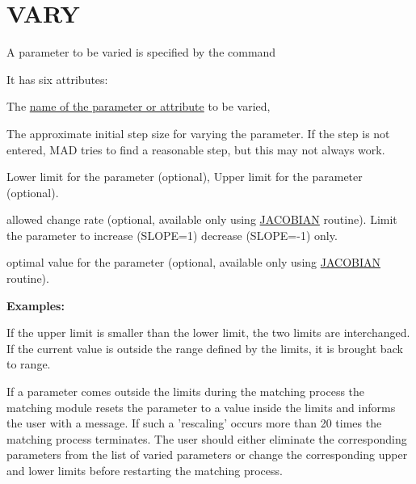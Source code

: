 \section{VARY}
\label{sec:vary}
A parameter to be varied is specified by the command 


It has six attributes: 
\begin{madlist}
   The \href{../Introduction/variable.html}{name of the
    parameter or attribute} to be varied,  

   The approximate initial step size for varying the
  parameter. If the step is not entered, MAD tries to find a
  reasonable step, but this may not always work.  

   Lower limit for the parameter (optional), 
   Upper limit for the parameter (optional). 

   allowed change rate (optional, available only using
  \href{match_xeq.html#jacobian}{JACOBIAN} routine). Limit the
  parameter to increase (SLOPE=1) decrease (SLOPE=-1) only.  

   optimal value for the parameter (optional, available
  only using \href{match_xeq.html#jacobian}{JACOBIAN} routine).  
\end{madlist}

{\bf Examples:}

If the upper limit is smaller than the lower limit, the two limits are
interchanged. If the current value is outside the range defined by the
limits, it is brought back to range. 

If a parameter comes outside the
limits during the matching process the matching module resets the
parameter to a value inside the limits and informs the user with a
message. If such a 'rescaling' occurs more than 20 times the matching
process terminates. The user should either eliminate the corresponding
parameters from the list of varied parameters or change the
corresponding upper and lower limits before restarting the matching
process. 

